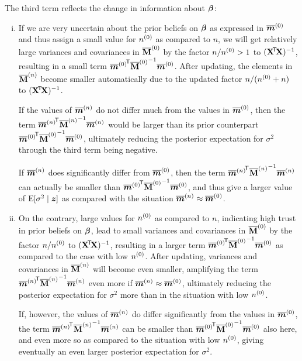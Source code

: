 The third term reflects the change in information about $\bbeta$:
\begin{enumerate}[(i)]
\item If we are very uncertain about the prior beliefs on $\bbeta$ as expressed in $\tmz$
and thus assign a small value for $\nz$ as compared to $n$,
we will get relatively large variances and covariances in $\tMz$ by the factor $n/\nz > 1$ %
to $(\XtX)^{-1}$, resulting in a small term ${\tmz}^\tra {\tMz}^{-1} \tmz$. After updating, the %
elements in $\tMn$ become smaller automatically
due to the updated factor $n/(\nz+n)$ %
to $(\XtX)^{-1}$.

If the values of $\tmn$ do not differ much from the values in $\tmz$,
then the term ${\tmn}^\tra {\tMn}^{-1} \tmn$ would be larger than
its prior counterpart ${\tmz}^\tra {\tMz}^{-1} \tmz$, ultimately reducing the posterior expectation for $\sigma^2$
through the third term being negative.

If $\tmn$ does significantly differ from $\tmz$,
then the term ${\tmn}^\tra {\tMn}^{-1} \tmn$ can actually be smaller than
${\tmz}^\tra {\tMz}^{-1} \tmz$, and thus give a larger value of $\E[\sigma^2\mid \z]$ 
as compared with the situation $\tmn \approx \tmz$.

\item On the contrary, large values for $\nz$ as compared to $n$, indicating
high trust in prior beliefs on $\bbeta$, %
lead to small variances and covariances in $\tMz$ by the factor $n/\nz$ %
to $(\XtX)^{-1}$,
resulting in a larger term ${\tmz}^\tra {\tMz}^{-1} \tmz$ as compared to the case with low $\nz$.
After updating, variances and covariances in $\tMn$ will become even smaller,
amplifying the term ${\tmn}^\tra {\tMn}^{-1} \tmn$ even more if
$\tmn \approx \tmz$,
ultimately reducing the posterior expectation for $\sigma^2$ more than in the situation with low $\nz$.

If, however, the values of $\tmn$ do differ significantly from the values in $\tmz$,
the term ${\tmn}^\tra {\tMn}^{-1} \tmn$ can be smaller than
${\tmz}^\tra {\tMz}^{-1} \tmz$ also here, and even more so as compared to the situation with low $\nz$,
giving eventually an even larger posterior expectation for $\sigma^2$.
\end{enumerate}


